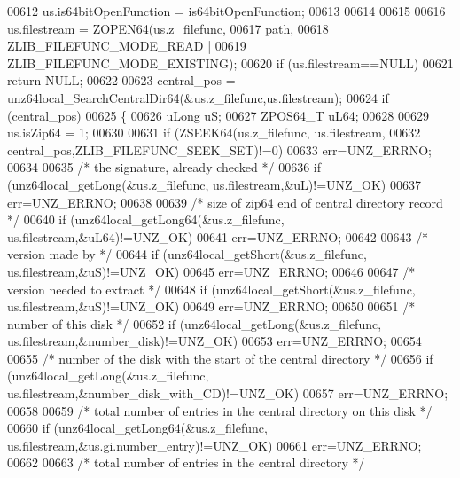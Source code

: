 \begin{DoxyCode}
00612     us.is64bitOpenFunction = is64bitOpenFunction;
00613 
00614 
00615 
00616     us.filestream = ZOPEN64(us.z\_filefunc,
00617                                                  path,
00618                                                  ZLIB\_FILEFUNC\_MODE\_READ |
00619                                                  ZLIB\_FILEFUNC\_MODE\_EXISTING);
00620     \textcolor{keywordflow}{if} (us.filestream==NULL)
00621         \textcolor{keywordflow}{return} NULL;
00622 
00623     central\_pos = unz64local\_SearchCentralDir64(&us.z\_filefunc,us.filestream);
00624     \textcolor{keywordflow}{if} (central\_pos)
00625     \{
00626         uLong uS;
00627         ZPOS64\_T uL64;
00628 
00629         us.isZip64 = 1;
00630 
00631         \textcolor{keywordflow}{if} (ZSEEK64(us.z\_filefunc, us.filestream,
00632                                       central\_pos,ZLIB\_FILEFUNC\_SEEK\_SET)!=0)
00633         err=UNZ\_ERRNO;
00634 
00635         \textcolor{comment}{/* the signature, already checked */}
00636         \textcolor{keywordflow}{if} (unz64local\_getLong(&us.z\_filefunc, us.filestream,&uL)!=UNZ\_OK)
00637             err=UNZ\_ERRNO;
00638 
00639         \textcolor{comment}{/* size of zip64 end of central directory record */}
00640         \textcolor{keywordflow}{if} (unz64local\_getLong64(&us.z\_filefunc, us.filestream,&uL64)!=UNZ\_OK)
00641             err=UNZ\_ERRNO;
00642 
00643         \textcolor{comment}{/* version made by */}
00644         \textcolor{keywordflow}{if} (unz64local\_getShort(&us.z\_filefunc, us.filestream,&uS)!=UNZ\_OK)
00645             err=UNZ\_ERRNO;
00646 
00647         \textcolor{comment}{/* version needed to extract */}
00648         \textcolor{keywordflow}{if} (unz64local\_getShort(&us.z\_filefunc, us.filestream,&uS)!=UNZ\_OK)
00649             err=UNZ\_ERRNO;
00650 
00651         \textcolor{comment}{/* number of this disk */}
00652         \textcolor{keywordflow}{if} (unz64local\_getLong(&us.z\_filefunc, us.filestream,&number\_disk)!=UNZ\_OK)
00653             err=UNZ\_ERRNO;
00654 
00655         \textcolor{comment}{/* number of the disk with the start of the central directory */}
00656         \textcolor{keywordflow}{if} (unz64local\_getLong(&us.z\_filefunc, us.filestream,&number\_disk\_with\_CD)!=UNZ\_OK)
00657             err=UNZ\_ERRNO;
00658 
00659         \textcolor{comment}{/* total number of entries in the central directory on this disk */}
00660         \textcolor{keywordflow}{if} (unz64local\_getLong64(&us.z\_filefunc, us.filestream,&us.gi.number\_entry)!=UNZ\_OK)
00661             err=UNZ\_ERRNO;
00662 
00663         \textcolor{comment}{/* total number of entries in the central directory */}

\end{DoxyCode}
